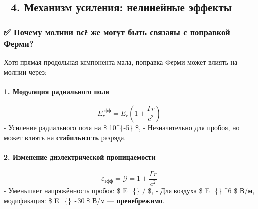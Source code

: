 \documentclass[11pt]{article}
\begin{document}
\subsection{🔹 4. Механизм усиления: нелинейные
эффекты}\label{ux43cux435ux445ux430ux43dux438ux437ux43c-ux443ux441ux438ux43bux435ux43dux438ux44f-ux43dux435ux43bux438ux43dux435ux439ux43dux44bux435-ux44dux444ux444ux435ux43aux442ux44b}

\subsubsection{✅ Почему молнии всё же могут быть связаны с поправкой
Ферми?}\label{ux43fux43eux447ux435ux43cux443-ux43cux43eux43bux43dux438ux438-ux432ux441ux451-ux436ux435-ux43cux43eux433ux443ux442-ux431ux44bux442ux44c-ux441ux432ux44fux437ux430ux43dux44b-ux441-ux43fux43eux43fux440ux430ux432ux43aux43eux439-ux444ux435ux440ux43cux438}

Хотя прямая продольная компонента мала, поправка Ферми может влиять на
молнии через:

\paragraph{\texorpdfstring{1. \textbf{Модуляция радиального
поля}}{1. Модуляция радиального поля}}\label{ux43cux43eux434ux443ux43bux44fux446ux438ux44f-ux440ux430ux434ux438ux430ux43bux44cux43dux43eux433ux43e-ux43fux43eux43bux44f}

\[
E_r^{\text{эфф}} = E_r \left( 1 + \frac{\Gamma r}{c^2} \right)
\] - Усиление радиального поля на \$ 10\^{}\{-5\} \$, - Незначительно
для пробоя, но может влиять на \textbf{стабильность} разряда.

\paragraph{\texorpdfstring{2. \textbf{Изменение диэлектрической
проницаемости}}{2. Изменение диэлектрической проницаемости}}\label{ux438ux437ux43cux435ux43dux435ux43dux438ux435-ux434ux438ux44dux43bux435ux43aux442ux440ux438ux447ux435ux441ux43aux43eux439-ux43fux440ux43eux43dux438ux446ux430ux435ux43cux43eux441ux442ux438}

\[
\varepsilon_{\text{эфф}} = \mathcal{G} = 1 + \frac{\Gamma r}{c^2}
\] - Уменьшает напряжённость пробоя: \$ E\_\{\}
/\sqrt{\varepsilon} \$, - Для воздуха \$ E\_\{\}
 \^{}6 \$ В/м,\\
модификация: \$ \Delta E\_\{\} \sim 30 \$ В/м ---
\textbf{пренебрежимо}.
\end{document}
